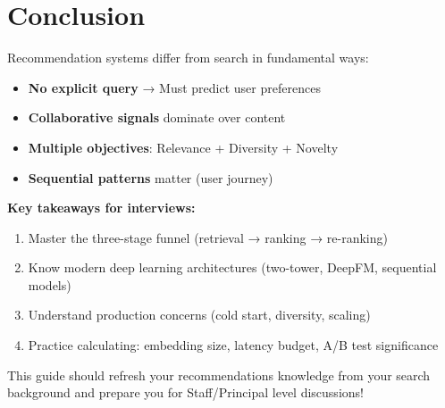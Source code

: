 \documentclass[10pt]{article}
\begin{document}
\section{Conclusion}

Recommendation systems differ from search in fundamental ways:
\begin{itemize}
\item \textbf{No explicit query} → Must predict user preferences
\item \textbf{Collaborative signals} dominate over content
\item \textbf{Multiple objectives}: Relevance + Diversity + Novelty
\item \textbf{Sequential patterns} matter (user journey)
\end{itemize}

\textbf{Key takeaways for interviews:}
\begin{enumerate}
\item Master the three-stage funnel (retrieval → ranking → re-ranking)
\item Know modern deep learning architectures (two-tower, DeepFM, sequential models)
\item Understand production concerns (cold start, diversity, scaling)
\item Practice calculating: embedding size, latency budget, A/B test significance
\end{enumerate}

This guide should refresh your recommendations knowledge from your search background and prepare you for Staff/Principal level discussions!
\end{document}
